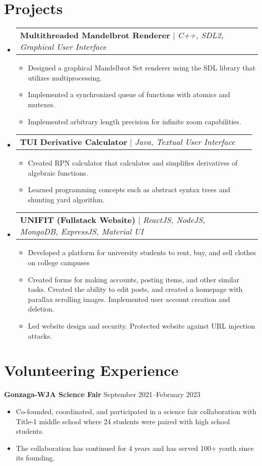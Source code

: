 \documentclass[11pt]{article}
\makeatletter
\newcommand{\resumeItem}[1]{
  \item\small{
    {#1 \vspace{-2pt}}
  }
}
\newcommand{\resumeProjectHeading}[2]{
    \item
    \begin{tabular*}{1.001\textwidth}{l@{\extracolsep{\fill}}r}
      \small#1 & \textbf{\small #2}\\
    \end{tabular*}\vspace{-7pt}
}
\newcommand{\resumeSubHeadingListStart}{\begin{itemize}[leftmargin=0.0in, label={}]}
\newcommand{\resumeSubHeadingListEnd}{\end{itemize}}
\newcommand{\resumeItemListStart}{\begin{itemize}}
\newcommand{\resumeItemListEnd}{\end{itemize}\vspace{-5pt}}
\makeatother
\begin{document}
\section{Projects}
    \vspace{-6pt}
    \resumeSubHeadingListStart
        \resumeProjectHeading
          {\textbf{Multithreaded Mandelbrot Renderer} $|$ \emph{C++, SDL2, Graphical User Interface}}{\ }
          \resumeItemListStart
            \resumeItem{Designed a graphical Mandelbrot Set renderer using the SDL library that utilizes multiprocessing.}
            \resumeItem{Implemented a synchronized queue of functions with atomics and mutexes.}
            \resumeItem{Implemented arbitrary length precision for infinite zoom capabilities.}
          \resumeItemListEnd
          \vspace{-14pt}
        \resumeProjectHeading
          {\textbf{TUI Derivative Calculator} $|$ \emph{Java, Textual User Interface}}{\ }
          \resumeItemListStart
            \resumeItem{Created RPN calculator that calculates and simplifies derivatives of algebraic functions.}
            \resumeItem{Learned programming concepts such as abstract syntax trees and shunting yard algorithm.}
          \resumeItemListEnd
          \vspace{-14pt}
        \resumeProjectHeading
          {\textbf{UNIFIT (Fullstack Website)} $|$ \emph{ReactJS, NodeJS, MongoDB, ExpressJS, Material UI}}{\ }
          \resumeItemListStart
            \resumeItem{Developed a platform for university students to rent, buy, and sell clothes on college campuses}
            \resumeItem{Created forms for making accounts, posting items, and other similar tasks. Created the ability to edit posts, and created a homepage with parallax scrolling images. Implemented user account creation and deletion.}
            \resumeItem{Led website design and security. Protected website against URL injection attacks.}
          \resumeItemListEnd
          \vspace{-3pt}
    \resumeSubHeadingListEnd
\vspace{-3pt}
\section{Volunteering Experience}
 \begin{itemize}[leftmargin=0.1in, label={}]
    \small{\item{
     \textbf{Gonzaga-WJA Science Fair} \hfill { September 2021--February 2023}
     \vspace{-7pt}
    \resumeItemListStart
        \resumeItem{Co-founded, coordinated, and participated in a science fair collaboration with Title-1 middle school where 24 students were paired with high school students.}
        \resumeItem{The collaboration has continued for 4 years and has served 100+ youth since its founding.}
    \resumeItemListEnd
    }}
 \end{itemize}
 \vspace{-16pt}
\end{document}
